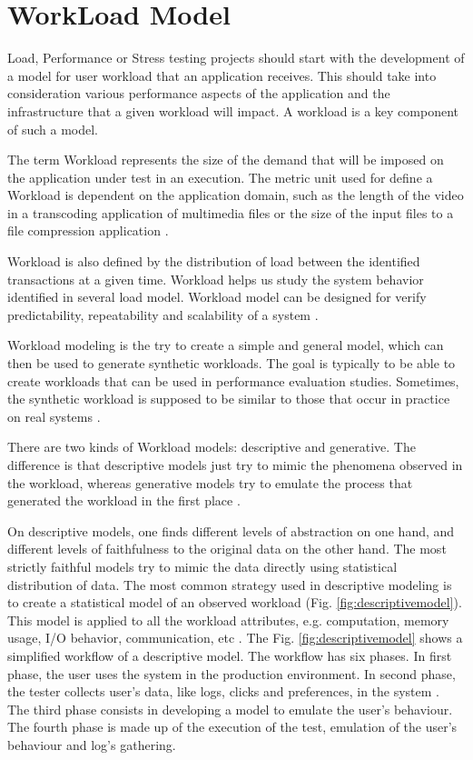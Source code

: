 \section{WorkLoad Model}

Load, Performance or Stress testing projects should start with the development of a model for user workload that an application receives. This should take into consideration various performance aspects of the application and the infrastructure that a given workload will impact. A workload is a key component of such a model.

The term Workload represents  the size of the demand that will be imposed on the application under test in an execution. The metric unit used for define a Workload is dependent on the application domain, such as the length of the video in a transcoding application of multimedia files or the size of the input files to a file compression application \cite{Feitelson2013} \cite{Molyneaux2009} \cite{Goncalves2014}. 

Workload is also defined by the distribution of load between the identified transactions at a given time. Workload helps us study the system behavior identified in several load model. Workload model can be designed for verify predictability, repeatability and scalability of a system \cite{Feitelson2013} \cite{Molyneaux2009}.


Workload modeling is the try to create a simple and general model, which can
then be used to generate synthetic workloads. The goal is typically to be able to create workloads that can
be used in performance evaluation studies. Sometimes, the synthetic workload is supposed to be
similar to those that occur in practice on real systems \cite{Feitelson2013} \cite{Molyneaux2009}.

There are two kinds of Workload models: descriptive and generative. The difference is that descriptive models just try to mimic the phenomena observed in the workload, whereas generative models try to emulate the process that generated the workload in the first place \cite{DiLucca2006}. 

On descriptive models, one finds different levels of abstraction on one hand, and different levels of faithfulness to the original data on the other hand. The
most strictly faithful models try to mimic the data directly using statistical distribution of data. The most common strategy used in descriptive modeling is to create a statistical
model of an observed workload (Fig. \ref{fig:descriptivemodel}). This model is applied to all the workload
attributes, e.g. computation, memory usage, I/O behavior, communication, etc \cite{DiLucca2006}. The Fig. \ref{fig:descriptivemodel} shows a simplified workflow of a descriptive model. The workflow has six phases. In first phase, the user uses the system in the production environment. In second phase, the tester collects user's data, like logs, clicks and preferences, in the system . The third phase consists in developing a model to emulate the user's behaviour. The fourth phase is made up of the execution of the test, emulation of the user's behaviour and log's gathering.


